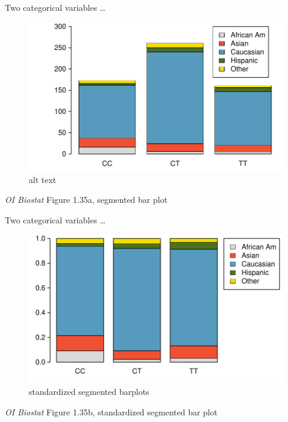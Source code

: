 \documentclass[10pt]{beamer}\usepackage[]{graphicx}\usepackage[]{color}
\begin{document}
						\begin{frame}{Two categorical variables \dots}
							\protect\hypertarget{two-categorical-variables-2}{}
							
							\begin{figure}
								\centering
								\includegraphics{figures/famussSegBarA.pdf}
								\caption{alt text}
							\end{figure}
							
							\emph{OI Biostat} Figure 1.35a, segmented bar plot
							
						\end{frame}
						
						\begin{frame}{Two categorical variables \dots}
							\protect\hypertarget{two-categorical-variables-3}{}
							
							\begin{figure}
								\centering
								\includegraphics{figures/famussSegBarStaA.pdf}
								\caption{standardized segmented barplots}
							\end{figure}
							
							\emph{OI Biostat} Figure 1.35b, standardized segmented bar plot
							
						\end{frame}
						
\end{document}
